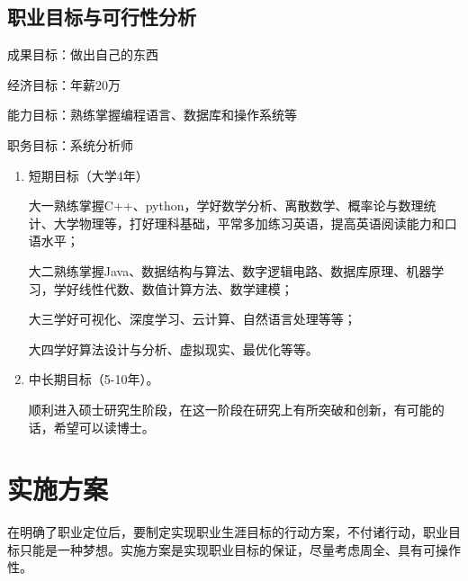 \documentclass{article}
\begin{document}
\subsection{职业目标与可行性分析}
成果目标：做出自己的东西\par
经济目标：年薪20万\par
能力目标：熟练掌握编程语言、数据库和操作系统等\par
职务目标：系统分析师\par

\begin{enumerate}[(1)]
	\item 短期目标（大学4年）\par
	 大一熟练掌握C++、python，学好数学分析、离散数学、概率论与数理统计、大学物理等，打好理科基础，平常多加练习英语，提高英语阅读能力和口语水平；\par
     大二熟练掌握Java、数据结构与算法、数字逻辑电路、数据库原理、机器学习，学好线性代数、数值计算方法、数学建模；\par
     大三学好可视化、深度学习、云计算、自然语言处理等等；\par
     大四学好算法设计与分析、虚拟现实、最优化等等。\par
	\item 中长期目标（5-10年）。\par
	顺利进入硕士研究生阶段，在这一阶段在研究上有所突破和创新，有可能的话，希望可以读博士。\par

\end{enumerate}

\section{实施方案}
在明确了职业定位后，要制定实现职业生涯目标的行动方案，不付诸行动，职业目标只能是一种梦想。实施方案是实现职业目标的保证，尽量考虑周全、具有可操作性。\par
\end{document}
